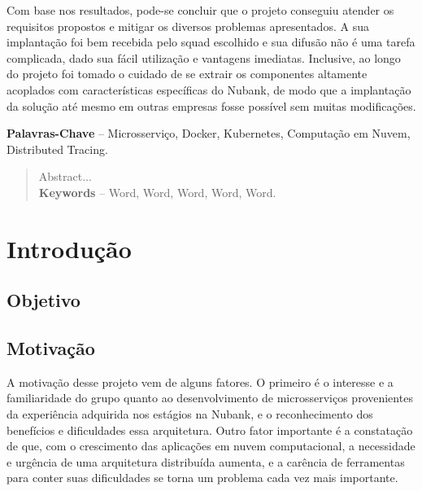 \documentclass[twosideprint]{politex}
\begin{document}
\begin{resumo}
	Com base nos resultados, pode-se concluir que o projeto conseguiu atender os requisitos propostos e mitigar os diversos problemas apresentados. A sua implantação foi bem recebida pelo squad escolhido e sua difusão não é uma tarefa complicada, dado sua fácil utilização e vantagens imediatas. Inclusive, ao longo do projeto foi tomado o cuidado de se extrair os componentes altamente acoplados com características específicas do Nubank, de modo que a implantação da solução até mesmo em outras empresas fosse possível sem muitas modificações.
	
%
%
\textbf{Palavras-Chave} -- Microsserviço, Docker, Kubernetes, Computação em Nuvem, Distributed Tracing.
\end{resumo}


\begin{abstract}
Abstract...
%
\\[3\baselineskip]
%
\textbf{Keywords} -- Word, Word, Word, Word, Word.
\end{abstract}






\sumario




	
\chapter{Introdução}
	\section{Objetivo}
	\section{Motivação}
	A motivação desse projeto vem de alguns fatores. O primeiro é o interesse e a familiaridade do grupo quanto ao desenvolvimento de microsserviços provenientes da experiência adquirida nos estágios na Nubank, e o reconhecimento dos benefícios e dificuldades essa arquitetura. Outro fator importante é a constatação de que, com o crescimento das aplicações em nuvem computacional, a necessidade e urgência de uma arquitetura distribuída aumenta, e a carência de ferramentas para conter suas dificuldades se torna um problema cada vez mais importante.
	
\end{document}
